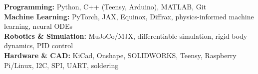 \textbf{Programming:} Python, C++ (Teensy, Arduino), MATLAB, Git\\
\textbf{Machine Learning:} PyTorch, JAX, Equinox, Diffrax, physics-informed machine learning, neural ODEs\\
\textbf{Robotics \& Simulation:} MuJoCo/MJX, differentiable simulation, rigid-body dynamics, PID control\\
\textbf{Hardware \& CAD:} KiCad, Onshape, SOLIDWORKS, Teensy, Raspberry Pi/Linux, I2C, SPI, UART, soldering
